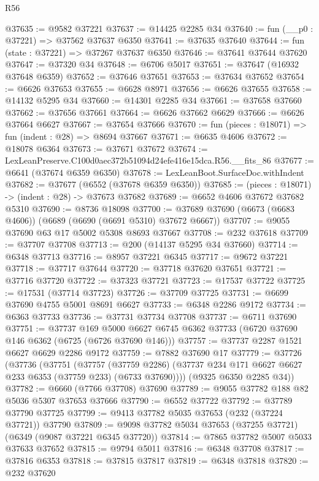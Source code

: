 \begin{lexlean}{R56}
\begin{coremodule}
@37635 := @9582 @37221
@37637 := @14425 @2285 @34
@37640 := fun (__p0 : @37221) => @37562 @37637 @6350
@37641 := @37635 @37640
@37644 := fun (state : @37221) => @37267 @37637 @6350
@37646 := @37641 @37644 @37620
@37647 := @37320 @34
@37648 := @6706 @5017
@37651 := @37647 (@16932 @37648 @6359)
@37652 := @37646 @37651
@37653 := @37634 @37652
@37654 := @6626 @37653
@37655 := @6628 @8971
@37656 := @6626 @37655
@37658 := @14132 @5295 @34
@37660 := @14301 @2285 @34
@37661 := @37658 @37660
@37662 := @37656 @37661
@37664 := @6626 @37662 @6629
@37666 := @6626 @37664 @6627
@37667 := @37654 @37666
@37670 := fun (pieces : @18071) => fun (indent : @28) => @8694 @37667
@37671 := @6635 @4606
@37672 := @18078 @6364
@37673 := @37671 @37672
@37674 := LexLeanPreserve.C100d0aec372b51094d24efe416e15dca.R56.__fits_86
@37677 := @6641 (@37674 @6359 @6350)
@37678 := LexLeanBoot.SurfaceDoc.withIndent
@37682 := @37677 (@6552 (@37678 @6359 @6350))
@37685 := (pieces : @18071) -> (indent : @28) -> @37673 @37682
@37689 := @6652 @4606 @37672 @37682 @5310
@37690 := @8736 @18098
@37700 := @37689 @37690 (@6673 (@6683 @4606)) (@6689 (@6690 (@6691 @5310) @37672 @6667))
@37707 := @9055 @37690 @63 @17 @5002 @5308 @8693 @37667
@37708 := @232 @37618
@37709 := @37707 @37708
@37713 := @200 (@14137 @5295 @34 @37660)
@37714 := @6348 @37713
@37716 := @8957 @37221 @6345
@37717 := @9672 @37221
@37718 := @37717 @37644
@37720 := @37718 @37620 @37651
@37721 := @37716 @37720
@37722 := @37323 @37721
@37723 := @17537 @37722
@37725 := @17531 (@37714 @37723)
@37726 := @37709 @37725
@37731 := @6699 @37690 @4755 @5001 @8691 @6627
@37733 := @6348 @2286 @9172
@37734 := @6363 @37733
@37736 := @37731 @37734 @37708
@37737 := @6711 @37690
@37751 := @37737
    @169
    @5000
    @6627
    @6745
    @6362
    @37733
    (@6720 @37690 @146 @6362 (@6725 (@6726 @37690 @146)))
@37757 := @37737 @2287 @1521 @6627 @6629 @2286 @9172
@37759 := @7882 @37690 @17
@37779 := @37726
    (@37736
      (@37751
        (@37757
          (@37759 @2286)
          (@37737 @234 @171 @6627 @6627 @233 @6353 (@37759 @233) (@6733 @37690))))
      (@9325 @6350 @2285 @34))
@37782 := @6660 (@7766 @37708) @37690
@37789 := @9055 @37782 @188 @82 @5036 @5307 @37653 @37666
@37790 := @6552 @37722
@37792 := @37789 @37790 @37725
@37799 := @9413 @37782 @5035 @37653 (@232 (@37224 @37721)) @37790
@37809 := @9098 @37782 @5034 @37653 (@37255 @37721) (@6349 (@9087 @37221 @6345 @37720))
@37814 := @7865 @37782 @5007 @5033 @37633 @37652
@37815 := @9794 @5011
@37816 := @6348 @37708
@37817 := @37816 @6353
@37818 := @37815 @37817
@37819 := @6348 @37818
@37820 := @232 @37620

\end{coremodule}
\end{lexlean}

